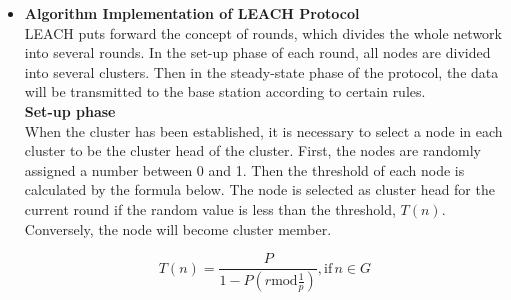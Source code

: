 \documentclass[11pt]{report}
\begin{document}
	\begin{itemize}
		\item \textbf{Algorithm Implementation of LEACH Protocol}\\
		LEACH puts forward the concept of rounds, which divides the whole network into several rounds. In the set-up phase of each round, all nodes are divided into several clusters. Then in the steady-state phase of the protocol, the data will be transmitted to the base station according to certain rules. \\
		
		\textbf{Set-up phase}\\
		When the cluster has been established, it is necessary to select a node in each cluster to be the cluster head of the cluster. First, the nodes are randomly assigned a number between 0 and 1. Then the threshold of each node is calculated by the formula below. The node is selected as cluster head for the current round if the random value is less than the threshold, $T(n)$. Conversely, the node will become cluster member. 
		
		\begin{equation}
		T(n) = \frac{P}{1-P(r\text{mod}\frac{1}{p})}, \text{if} \, n \in G
		\end{equation}
		

\end{itemize}
\end{document}
